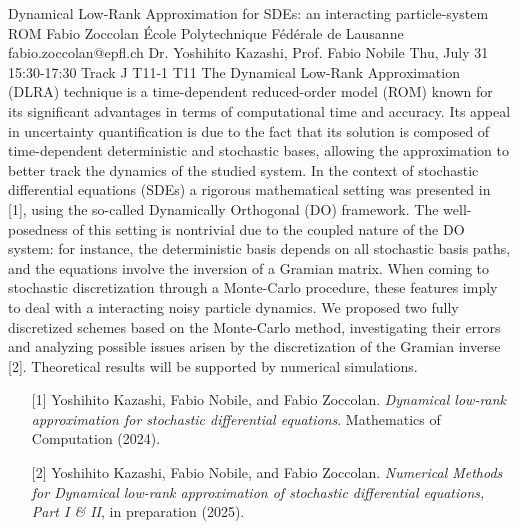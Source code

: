 \begin{talk}
  {Dynamical Low-Rank Approximation for SDEs: an interacting particle-system ROM}%
  {Fabio Zoccolan}%
  {École Polytechnique Fédérale de Lausanne}%
  {fabio.zoccolan@epfl.ch}%
  {Dr. Yoshihito Kazashi, Prof. Fabio Nobile}%
  {}%
  {Thu, July 31 15:30-17:30 Track J}%
  {T11-1}%
  {T11}%
The Dynamical Low-Rank Approximation (DLRA) technique is a time-dependent reduced-order model (ROM) known for its significant advantages in terms of computational time and accuracy. Its appeal in uncertainty quantification is due to the fact that its solution is composed of time-dependent deterministic and stochastic bases, allowing the approximation to better track the dynamics of the studied system. In the context of stochastic differential equations (SDEs) a rigorous mathematical setting was presented in [1], using the so-called Dynamically Orthogonal (DO) framework. The well-posedness of this setting is nontrivial due to the coupled nature of the DO system: for instance, the deterministic basis depends on all stochastic basis paths, and the equations involve the inversion of a Gramian matrix. When coming to stochastic discretization through a Monte-Carlo procedure, these features imply to deal with a interacting noisy particle dynamics. We proposed two fully discretized schemes based on the Monte-Carlo method, investigating their errors and analyzing possible issues arisen by the discretization of the Gramian inverse [2]. Theoretical results will be supported by numerical simulations.

\medskip
\begin{enumerate}
	\item[{[1]}] Yoshihito Kazashi, Fabio Nobile, and Fabio Zoccolan. {\it Dynamical low-rank approximation for stochastic differential equations}. Mathematics of Computation (2024).
	\item[{[2]}] Yoshihito Kazashi, Fabio Nobile, and Fabio Zoccolan. {\it Numerical Methods for Dynamical low-rank approximation of stochastic differential equations, Part I \& II}, in preparation (2025).
\end{enumerate}

\end{talk}
